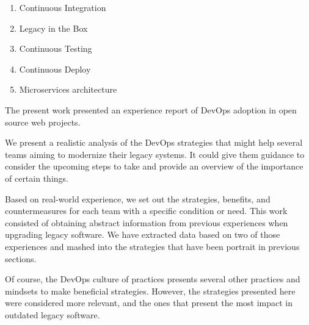 \begin{enumerate}
\item Continuous Integration	
\item Legacy in the Box
\item Continuous Testing
\item Continuous Deploy
\item Microservices architecture
\end{enumerate}


The present work presented an experience report of DevOps adoption in
\numberofprojects open source web projects. 

We present a realistic analysis of the DevOps strategies that might help several
teams aiming to modernize their legacy systems. It could give them guidance to
consider the upcoming steps to take and provide an overview of the importance of
certain things.

Based on real-world experience, we set out the strategies, benefits, and
countermeasures for each team with a specific condition or need. This work
consisted of obtaining abstract information from previous experiences when
upgrading legacy software. We have extracted data based on two of those
experiences and mashed into the strategies that have been portrait in previous
sections.

Of course, the DevOps culture of practices presents several other practices and
mindsets to make beneficial strategies. However, the strategies presented here
were considered more relevant, and the ones that present the most impact in
outdated legacy software.
